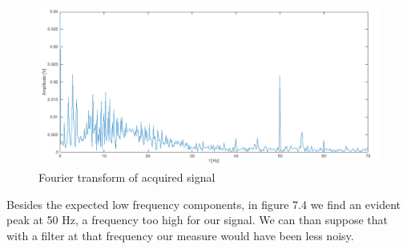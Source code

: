 \begin{figure}[H]
\centering
\includegraphics[width=.7\textwidth]{8/fft.png}
\caption{Fourier transform of acquired signal}
\end{figure}
Besides the expected low frequency components, in figure 7.4 we find an evident peak at 50 Hz, a frequency too high for our signal. We can than suppose that with a filter at that frequency our measure would have been less noisy.
